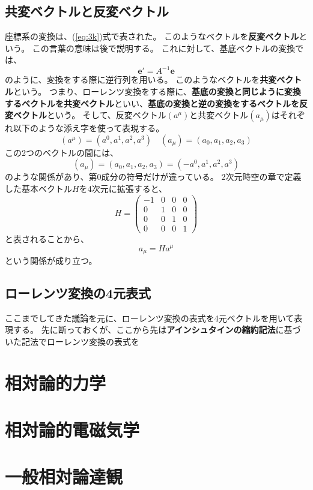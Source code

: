 \documentclass[a4paper]{jsreport}
\begin{document}
        \section{共変ベクトルと反変ベクトル}
            座標系の変換は、(\ref{eq:3k})式で表された。
            このようなベクトルを\textbf{反変ベクトル}という。
            この言葉の意味は後で説明する。
            これに対して、基底ベクトルの変換では、
            \begin{equation}
                \mathbf{e'} = A^{-1} \mathbf{e}
            \end{equation}
            のように、変換をする際に逆行列を用いる。
            このようなベクトルを\textbf{共変ベクトル}という。
            つまり、ローレンツ変換をする際に、\textbf{基底の変換と同じように変換するベクトルを共変ベクトル}といい、\textbf{基底の変換と逆の変換をするベクトルを反変ベクトル}という。
            そして、反変ベクトル$(a^{\mu})$と共変ベクトル$(a_\mu)$はそれぞれ以下のような添え字を使って表現する。
            \begin{equation}
                (a^{\mu}) = (a^0, a^1, a^2, a^3) \quad (a_{\mu}) = (a_0, a_1, a_2, a_3)
            \end{equation}
            この2つのベクトルの間には、
            \begin{equation}
                (a_{\mu}) =  (a_0, a_1, a_2, a_3) = (-a^0, a^1, a^2, a^3) 
            \end{equation}
            のような関係があり、第0成分の符号だけが違っている。
            2次元時空の章で定義した基本ベクトル$H$を4次元に拡張すると、
            \begin{equation}
                H = \begin{pmatrix}
                    -1 & 0 & 0 & 0 \\
                    0 & 1 & 0 & 0 \\
                    0 & 0 & 1 & 0 \\
                    0 & 0 & 0 & 1
                \end{pmatrix}
            \end{equation}
            と表されることから、
            \begin{equation}
                a_{\mu} = H a^{\mu}
            \end{equation}
            という関係が成り立つ。

        \section{ローレンツ変換の4元表式}
            ここまでしてきた議論を元に、ローレンツ変換の表式を4元ベクトルを用いて表現する。
            先に断っておくが、ここから先は\textbf{アインシュタインの縮約記法}に基づいた記法でローレンツ変換の表式を

    \chapter{相対論的力学}
    \chapter{相対論的電磁気学}
    \chapter{一般相対論達観}
\end{document}
